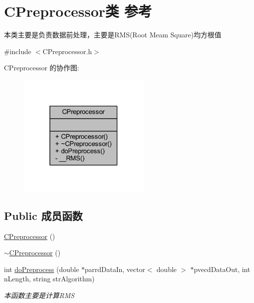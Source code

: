 \hypertarget{class_c_preprocessor}{}\section{C\+Preprocessor类 参考}
\label{class_c_preprocessor}


本类主要是负责数据前处理，主要是\+R\+M\+S(\+Root Meam Square)均方根值  




{\ttfamily \#include $<$C\+Preprocessor.\+h$>$}



C\+Preprocessor 的协作图\+:\nopagebreak
\begin{figure}[H]
\begin{center}
\leavevmode
\includegraphics[width=182pt]{class_c_preprocessor__coll__graph}
\end{center}
\end{figure}
\subsection*{Public 成员函数}
\begin{DoxyCompactItemize}
\item 
\hyperlink{class_c_preprocessor_a717b5ebb25759e4b25a2caef6e8ebceb}{C\+Preprocessor} ()
\item 
\hyperlink{class_c_preprocessor_ab669c61dd49b3533163393e3f2f5aba1}{$\sim$\+C\+Preprocessor} ()
\item 
int \hyperlink{class_c_preprocessor_ab3442e434eabf48db4bc6b86b915e985}{do\+Preprocess} (double $\ast$parrd\+Data\+In, vector$<$ double $>$ $\ast$pvecd\+Data\+Out, int n\+Length, string str\+Algorithm)
\begin{DoxyCompactList}\small\item\em 本函数主要是计算\+R\+MS \end{DoxyCompactList}\end{DoxyCompactItemize}
